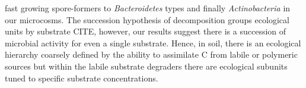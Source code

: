 fast growing spore-formers to \textit{Bacteroidetes} types and finally 
\textit{Actinobacteria} in our microcosms. The succession hypothesis of
decomposition groups ecological units by substrate CITE, however, our results
suggest there is a succession of microbial activity for even a single
substrate. Hence, in soil, there is an ecological hierarchy coarsely defined by
the ability to assimilate C from labile or polymeric sources but within
the labile substrate degraders there are ecological subunits tuned to specific
substrate concentrations.















